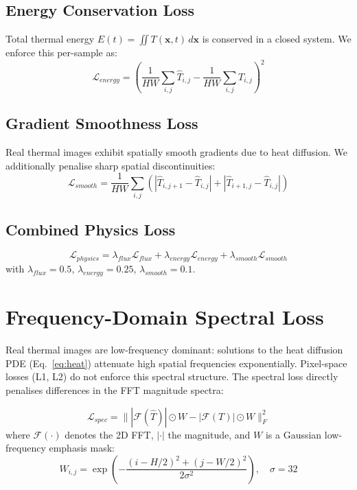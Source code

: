 \subsection{Energy Conservation Loss}

Total thermal energy $E(t) = \iint T(\mathbf{x}, t)\, d\mathbf{x}$ is conserved in a closed system. We enforce this per-sample as:
\begin{equation}
    \mathcal{L}_{energy} = \left( \frac{1}{HW}\sum_{i,j} \hat{T}_{i,j} - \frac{1}{HW}\sum_{i,j} T_{i,j} \right)^2
    \label{eq:energy}
\end{equation}

\subsection{Gradient Smoothness Loss}

Real thermal images exhibit spatially smooth gradients due to heat diffusion. We additionally penalise sharp spatial discontinuities:
\begin{equation}
    \mathcal{L}_{smooth} = \frac{1}{HW}\sum_{i,j} \left( |\hat{T}_{i,j+1} - \hat{T}_{i,j}| + |\hat{T}_{i+1,j} - \hat{T}_{i,j}| \right)
\end{equation}

\subsection{Combined Physics Loss}

\begin{equation}
    \mathcal{L}_{physics} = \lambda_{flux} \mathcal{L}_{flux} + \lambda_{energy} \mathcal{L}_{energy} + \lambda_{smooth} \mathcal{L}_{smooth}
    \label{eq:physics}
\end{equation}
with $\lambda_{flux} = 0.5$, $\lambda_{energy} = 0.25$, $\lambda_{smooth} = 0.1$.

\section{Frequency-Domain Spectral Loss}

Real thermal images are low-frequency dominant: solutions to the heat diffusion PDE (Eq.~\ref{eq:heat}) attenuate high spatial frequencies exponentially. Pixel-space losses (L1, L2) do not enforce this spectral structure. The spectral loss directly penalises differences in the FFT magnitude spectra:

\begin{equation}
    \mathcal{L}_{spec} = \| \left|\mathcal{F}(\hat{T})\right| \odot W - \left|\mathcal{F}(T)\right| \odot W \|_F^2
    \label{eq:spectral}
\end{equation}
where $\mathcal{F}(\cdot)$ denotes the 2D FFT, $|\cdot|$ the magnitude, and $W$ is a Gaussian low-frequency emphasis mask:
\begin{equation}
    W_{i,j} = \exp\left( -\frac{(i - H/2)^2 + (j - W/2)^2}{2\sigma^2} \right), \quad \sigma = 32
\end{equation}

